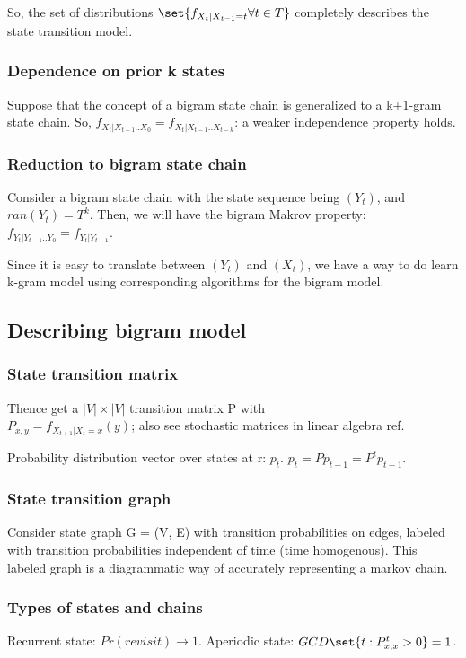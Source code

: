 \documentclass[oneside, article]{memoir}
\begin{document}
So, the set of distributions $\set{f_{X_t|X_{t-1} = t} \forall t \in T}$ completely describes the state transition model.

\subsubsection{Dependence on prior k states}
Suppose that the concept of a bigram state chain is generalized to a k+1-gram state chain. So, $f_{X_t|X_{t-1} .. X_0} = f_{X_t | X_{t-1} .. X_{t-k}}$: a weaker independence property holds.

\subsubsection{Reduction to bigram state chain}
Consider a bigram state chain with the state sequence being $(Y_t)$, and $ran(Y_t) = T^{k}$. Then, we will have the bigram Makrov property: $f_{Y_t | Y_{t-1} .. Y_0} = f_{Y_t|Y_{t-1}}$.

Since it is easy to translate between $(Y_t)$ and $(X_t)$, we have a way to do learn k-gram model using corresponding algorithms for the bigram model.

\subsection{Describing bigram model}
\subsubsection{State transition matrix}
Thence get a $|V| \times |V|$ transition matrix P with \\$P_{x,y} = f_{X_{t+1}| X_{t} = x}(y)$; also see stochastic matrices in linear algebra ref.

Probability distribution vector over states at r: $p_t$. $p_{t} = P p_{t-1} = P^{t}p_{t-1}$.

\subsubsection{State transition graph}
Consider state graph G = (V, E) with transition probabilities on edges, labeled with transition probabilities independent of time (time homogenous). This labeled graph is a diagrammatic way of accurately representing a markov chain.

\subsubsection{Types of states and chains}
Recurrent state: $Pr(revisit) \rightarrow 1$. Aperiodic state: $GCD \set{t: P^{t}_{x,x} >0} = 1$.
\end{document}

